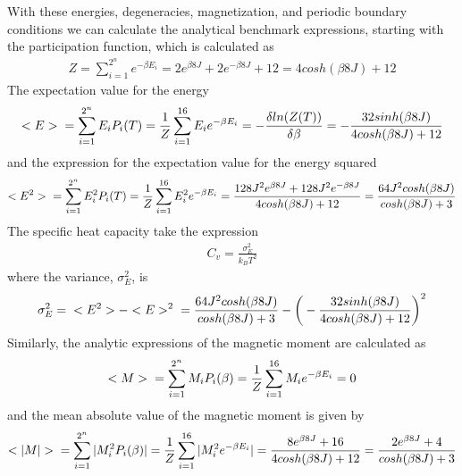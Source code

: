 \documentclass[12pt,english,a4paper]{article}
\begin{document}
With these energies, degeneracies, magnetization, and periodic boundary conditions we can calculate the analytical benchmark expressions, starting with the participation function, which is calculated as
\begin{align*}
    Z = \sum_{i=1}^{2^n} e^{-\beta E_i}
      = 2e^{\beta 8J} + 2e^{-\beta 8J} + 12
      = 4cosh(\beta 8J) + 12
\end{align*}
The expectation value for the energy
\begin{align*}
    <E> \hspace{0.2cm} 
        = \sum_{i=1}^{2^n} E_iP_i(T) 
        = \frac{1}{Z} \sum_{i=1}^{16} E_ie^{-\beta E_i}
        = - \frac{\delta ln(Z(T))}{\delta \beta}
        = -\frac{32sinh(\beta 8J)}{4cosh(\beta 8J) + 12}
\end{align*}
and the expression for the expectation value for the energy squared
\begin{align*}
    <E^2> \hspace{0.2cm} 
          = \sum_{i=1}^{2^n} E_i^2P_i(T) 
          = \frac{1}{Z} \sum_{i=1}^{16} E_i^2e^{-\beta E_i}
          = \frac{128J^2e^{\beta 8J} + 128J^2e^{-\beta 8J}}
                 {4cosh(\beta 8J) + 12}
          = \frac{64J^2cosh(\beta 8J)}{cosh(\beta 8J) + 3}
\end{align*}
The specific heat capacity take the expression
\begin{align*}
    C_v = \frac{\sigma_E^2}{k_BT^2} 
\end{align*}
where the variance, $\sigma_E^2$, is
\begin{align*}
    \sigma_E^2 = \hspace{0.2cm} <E^2> - <E>^2 \hspace{0.2cm}
               = \frac{64J^2cosh(\beta 8J)}{cosh(\beta 8J) + 3}
               - \bigg(-\frac{32sinh(\beta 8J)}{4cosh(\beta 8J) + 12}\bigg)^2
\end{align*}
Similarly, the analytic expressions of the magnetic moment are calculated as
\begin{align*}
    <M> \hspace{0.2cm} 
        = \sum_{i=1}^{2^n} M_iP_i(\beta) 
        = \frac{1}{Z} \sum_{i=1}^{16} M_ie^{-\beta E_i} = 0 
\end{align*}
and the mean absolute value of the magnetic moment is given by 
\begin{align*}
    <|M|> \hspace{0.2cm} 
          = \sum_{i=1}^{2^n} |M_i^2P_i(\beta)| 
          = \frac{1}{Z} \sum_{i=1}^{16} |M_i^2e^{-\beta E_i}|
          = \frac{8e^{\beta 8J} + 16}{4cosh(\beta 8J) + 12}
          = \frac{2e^{\beta 8J} + 4}{cosh(\beta 8J) + 3}
\end{align*}
\end{document}
